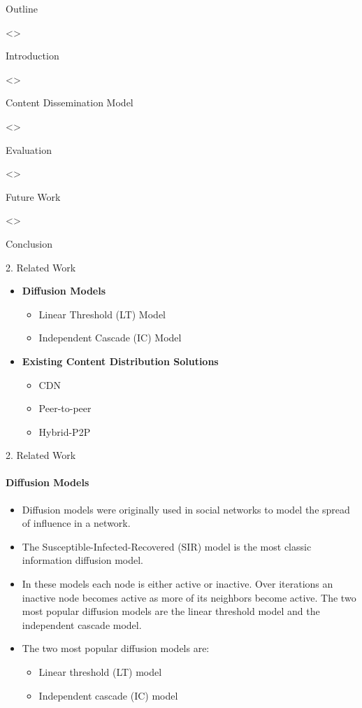 \documentclass{beamer}		%
\begin{document}
\begin{frame}{Outline}
\begin{enumerate}[1. ]
\uncover<>{\item Introduction}
\uncover<>{\item Content Dissemination Model}
\uncover<>{\item Evaluation}
\uncover<>{\item Future Work}
\uncover<>{\item Conclusion}
\end{enumerate}
\end{frame}

\begin{frame}{2. Related Work}
\begin{itemize}
    \item \textbf{Diffusion Models}
    \begin{itemize}
        \item Linear Threshold (LT) Model
        \item Independent Cascade (IC) Model
    \end{itemize}
\end{itemize}
\begin{itemize}
    \item \textbf{Existing Content Distribution Solutions}
    \begin{itemize}
        \item CDN
        \item Peer-to-peer
        \item Hybrid-P2P 
    \end{itemize}
\end{itemize}
\end{frame}

\begin{frame}{2. Related Work}
\framesubtitle{Diffusion Models}
\begin{itemize}
    \item Diffusion models were originally used in social networks to model the spread of influence in a network.
    \item The Susceptible-Infected-Recovered (SIR) model is the most classic information diffusion model.
    \item In these models each node is either active or inactive. Over iterations an inactive node becomes active as more of its neighbors become active. The two most popular diffusion models are the linear threshold model and the independent cascade model.
    \item The two most popular diffusion models are:
    \begin{itemize}
        \item Linear threshold (LT) model
        \item Independent cascade (IC) model
    \end{itemize} 
\end{itemize}
\end{frame}
\end{document}
